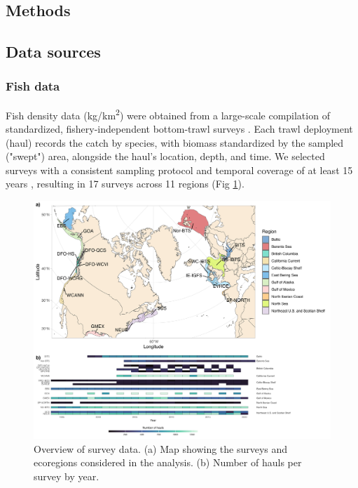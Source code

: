 \documentclass[11pt]{article}
\begin{document}
\begin{spacing}{1.5}

\section{Methods}

\subsection{Data sources}

\subsubsection{Fish data}

Fish density data (kg/km\textsuperscript{2}) were obtained from 
a large-scale compilation of standardized, fishery-independent bottom-trawl surveys \citep{maureaud_fishglob_data_2024}. Each trawl deployment (haul) records the catch by species, with biomass standardized by the sampled ("swept") area, alongside the haul’s location, depth, and time. We selected surveys with a consistent sampling protocol and temporal coverage of at least 15 years \citep{maureaud_fishglob_data_2024}, resulting in 17 surveys across 11 regions (Fig \ref{fig:map}).

\begin{figure}[h]
    \centering
    \includegraphics[scale=0.7]{images/map.png}
\caption{Overview of survey data. (a) Map showing the surveys and ecoregions considered in the analysis. (b) Number of hauls per survey by year.}
    \label{fig:map}
\end{figure}


\end{spacing}
\end{document}
